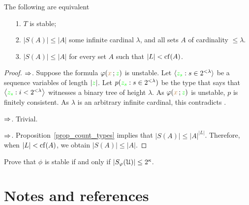 \documentclass[creche.tex]{subfiles}
\begin{document}
\begin{theorem}
The following are equivalent
\begin{itemize}
\item[1.] $T$ is stable;
\item[2.] $|S(A)|\le|A|$ some infinite cardinal $\lambda$, and all sets $A$ of cardinality $\le\lambda$.
\item[3.] $|S(A)|\le|A|$ for every set $A$ such that $|L|<\mathop{\rm cf}(A)$.
\end{itemize}
\end{theorem}
\begin{proof}
$\Rightarrow$. Suppose the formula $\varphi({\color{brown} x}\,;{\color{green} z})$ is unstable. Let $\langle{\color{green}z_s}:s\in2^{<\lambda}\rangle$ be a sequence variables of length $|{\color{green} z}|$. Let $p({\color{green} z_s}:s\in2^{<\lambda})$ be the type that says that $\big\langle{\color{green}z_s}:i<2^{<\lambda}\big\rangle$ witnesses a binary tree of height $\lambda$. As  $\varphi({\color{brown} x}\,;{\color{green} z})$ is unstable, $p$ is finitely consistent. As $\lambda$ is an arbitrary infinite cardinal, this contradicts .

$\Rightarrow$. Trivial.

$\Rightarrow$. Proposition~\ref{prop_count_types} implies that $|S(A)|\le |A|^{|L|}$. Therefore, when $|L|<\mathop{\rm cf}(A)$, we obtain $|S(A)|\le |A|$.
\end{proof}
\begin{exercise}
Prove that $\phi$ is stable if and only if $|S_\varphi(\EuScript U)|\le2^\kappa$.\QED
\end{exercise}



\section{Notes and references}
\begin{biblist}[]\normalsize


\end{biblist}
\end{document}
